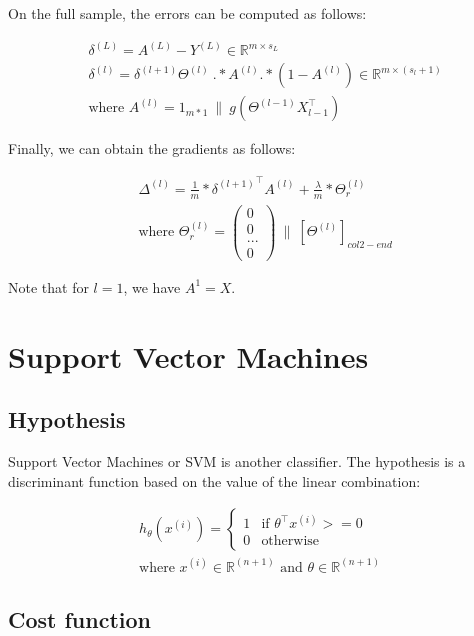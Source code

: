 \documentclass[a4paper, 12pt]{article}
\begin{document}
On the full sample, the errors can be computed as follows:

\begin{align*}
& \delta^{(L)} = A^{(L)} - Y^{(L)} \in \mathbb{R}^{m\times s_{L}} \\
& \delta^{(l)} =  \delta^{(l+1)} \Theta^{(l)} \: .* A^{(l)} .* (1-A^{(l)}) \in \mathbb{R}^{m\times (s_{l}+1)} \\
& \text{where } A^{(l)} = 1_{m*1} \: \| \: g(\Theta^{(l-1)}X_{l-1}^{\top}) 
\end{align*}

Finally, we can obtain the gradients as follows:

\begin{align*}
& \Delta^{(l)} = \frac{1}{m} * {\delta^{(l+1)}}^{\top}A^{(l)}  + \frac{\lambda}{m} * \Theta_{r}^{(l)} \\
& \text{where } \Theta_{r}^{(l)} = \begin{pmatrix} 0 \\ 0 \\ ... \\ 0 \end{pmatrix} \: \| \: \left[\Theta^{(l)}\right]_{col 2-end}
\end{align*}

Note that for $l=1$, we have $A^{1}=X$.

\section{Support Vector Machines}

\subsection{Hypothesis}

Support Vector Machines or SVM is another classifier.  The hypothesis is a discriminant function based on the value of the linear combination:

\begin{align*}
& h_{\theta}(x^{(i)}) = 
\begin{cases}
1 & \text{if } \theta^{\top}x^{(i)} >= 0 \\
0 & \text{otherwise} 
\end{cases}
& \\
& \text{where } x^{(i)} \in \mathbb{R}^{(n+1)} \text{ and } \theta \in \mathbb{R}^{(n+1)}
\end{align*}

\subsection{Cost function}
\end{document}
